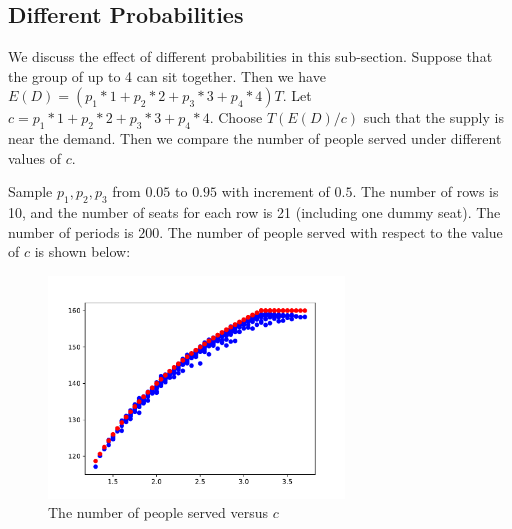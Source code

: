 \subsection{Different Probabilities}
We discuss the effect of different probabilities in this sub-section. Suppose that the group of up to 4 can sit together. Then we have $E(D) = (p_1 * 1 + p_2 * 2 + p_3 * 3 + p_4 * 4) T$. Let $c = p_1 * 1 + p_2 * 2 + p_3 * 3 + p_4 * 4$. Choose $T(E(D)/c)$ such that the supply is near the demand. Then we compare the number of people served under different values of $c$. 




Sample $p_1, p_2, p_3$ from $0.05$ to $0.95$ with increment of $0.5$. The number of rows is 10, and the number of seats for each row is 21 (including one dummy seat). The number of periods is $200$. The number of people served with respect to the value of $c$ is shown below:


\begin{figure}[ht]
  \centering
  \includegraphics[width = 0.7\textwidth]{./Figures/diff_2.pdf}
  \caption{The number of people served versus $c$}
\end{figure}

